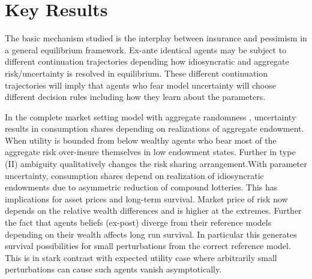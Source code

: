 \documentclass[12pt]{article}
\begin{document}


\section{Key Results}
\noindent The basic mechanism studied is the interplay between insurance and pessimism in a general equilibrium framework. Ex-ante identical agents may be subject to different continuation trajectories depending how idiosyncratic and aggregate risk/uncertainty is resolved in equilibrium. These different continuation trajectories will imply that agents who fear model uncertainty will choose different decision rules including how they learn about the parameters.

\noindent In the complete market setting model with aggregate randomness , uncertainty results in consumption shares depending on realizations of aggregate endowment. When utility is bounded from below wealthy agents who bear most of the aggregate risk over-insure themselves in low endowment states. Further in type (II) ambiguity qualitatively changes the risk sharing arrangement.With parameter uncertainty, consumption shares depend on realization of idiosyncratic endowments due to asymmetric reduction of compound lotteries. This has implications for asset prices and long-term survival. Market price of risk now depends on the relative wealth differences and is higher at the extremes. Further  the fact that agents beliefs (ex-post) diverge from their reference models depending on their wealth affects long run survival. In particular this generates survival possibilities for small perturbations from the correct reference model. This is in stark contrast with expected utility case where arbitrarily small 
perturbations can cause such agents vanish asymptotically. 
\end{document}
